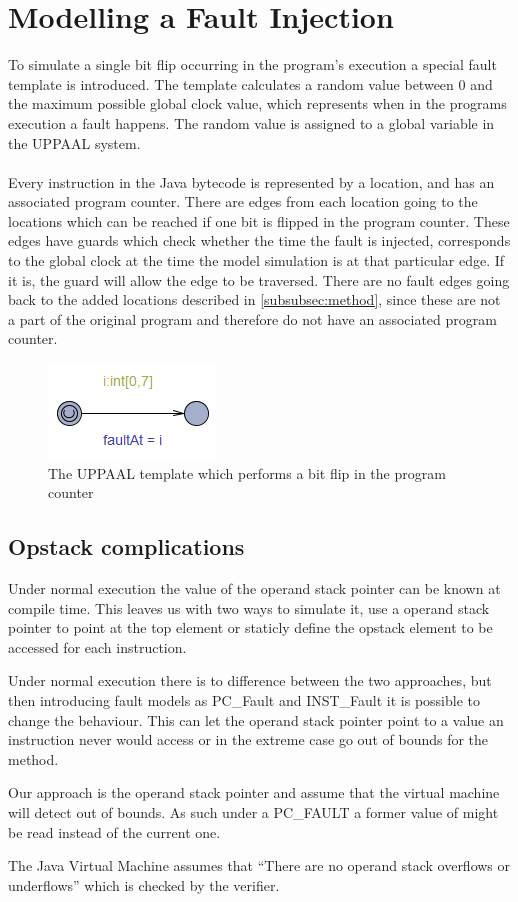 \section{Modelling a Fault Injection}
To simulate a single bit flip occurring in the program's execution a special fault template is introduced. The template calculates a random value between $0$ and the maximum possible global clock value, which represents when in the programs execution a fault happens. The random value is assigned to a global variable in the UPPAAL system.\\\\
Every instruction in the Java bytecode is represented by a location, and has an associated program counter. There are edges from each location going to the locations which can be reached if one bit is flipped in the program counter. These edges have guards which check whether the time the fault is injected, corresponds to the global clock at the time the model simulation is at that particular edge. If it is, the guard will allow the edge to be traversed. There are no fault edges going back to the added locations described in \cref{subsubsec:method}, since these are not a part of the original program and therefore do not have an associated program counter.
\begin{figure}[H]
\centering
\includegraphics{figures/fault.PNG}
\caption{The UPPAAL template which performs a bit flip in the program counter}
\end{figure}


\subsection{Opstack complications}
Under normal execution the value of the operand stack pointer can be known at compile  time. This leaves us with two ways to simulate it, use a operand stack pointer to point at the top element or staticly define the opstack element to be accessed for each instruction.

Under normal execution there is to difference between the two approaches, but then introducing fault models as PC\_Fault and INST\_Fault it is possible to change the behaviour. This can let the operand stack pointer point to a value an instruction never would access or in the extreme case go out of bounds for the method.

Our approach is the operand stack pointer and assume that the virtual machine will detect out of bounds. As such under a PC\_FAULT a former value of might be read instead of the current one.

The Java Virtual Machine assumes that ``There are no operand stack overflows or underflows'' \cite[c. 4.10]{java_spec} which is checked by the verifier.
